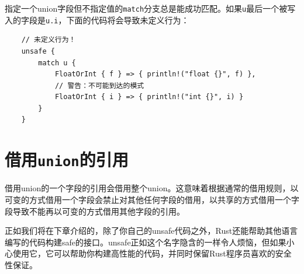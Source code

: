 指定一个union字段但不指定值的\texttt{match}分支总是能成功匹配。如果\texttt{u}最后一个被写入的字段是\texttt{u.i}，下面的代码将会导致未定义行为：
\begin{verbatim}
    // 未定义行为！
    unsafe {
        match u {
            FloatOrInt { f } => { println!("float {}", f) },
            // 警告：不可能到达的模式
            FloatOrInt { i } => { println!("int {}", i) }
        }
    }
\end{verbatim}

\section{借用\texttt{union}的引用}
借用union的一个字段的引用会借用整个union。这意味着根据通常的借用规则，以可变的方式借用一个字段会禁止对其他任何字段的借用，以共享的方式借用一个字段导致不能再以可变的方式借用其他字段的引用。

正如我们将在下章介绍的，除了你自己的unsafe代码之外，Rust还能帮助其他语言编写的代码构建safe的接口。unsafe正如这个名字隐含的一样令人烦恼，但如果小心使用它，它可以帮助你构建高性能的代码，并同时保留Rust程序员喜欢的安全性保证。

